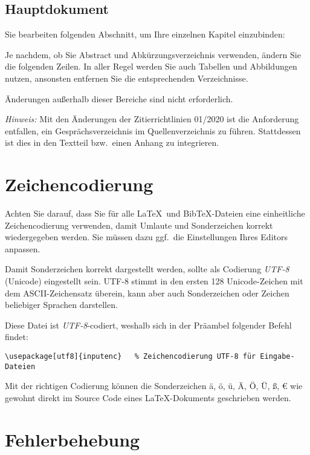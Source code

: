 \subsection{Hauptdokument}

Sie bearbeiten folgenden Abschnitt, um Ihre einzelnen Kapitel einzubinden:
\lstset{language=}


Je nachdem, ob Sie Abstract und Abkürzungsverzeichnis verwenden, ändern Sie die folgenden Zeilen.
In aller Regel werden Sie auch Tabellen und Abbildungen nutzen, ansonsten entfernen Sie die entsprechenden Verzeichnisse. 


Änderungen außerhalb dieser Bereiche sind nicht erforderlich.

\emph{Hinweis:} Mit den Änderungen der Zitierrichtlinien 01/2020 ist die Anforderung entfallen, ein Gesprächsverzeichnis im Quellenverzeichnis zu führen. Stattdessen ist dies in den Textteil bzw.\ einen Anhang zu integrieren.


\section{Zeichencodierung}\label{section:zeichencodierung}

Achten Sie darauf, dass Sie für alle \LaTeX\ und BibTeX-Dateien eine einheitliche Zeichencodierung verwenden, damit Umlaute und Sonderzeichen korrekt wiedergegeben werden. Sie müssen dazu ggf.\ die Einstellungen Ihres Editors anpassen.

Damit Sonderzeichen korrekt dargestellt werden, sollte als Codierung \emph{UTF-8} (Unicode) eingestellt sein. UTF-8 stimmt in den ersten 128 Unicode-Zeichen mit dem ASCII-Zeichensatz überein, kann aber auch Sonderzeichen oder Zeichen beliebiger Sprachen darstellen.

Diese Datei ist \emph{UTF-8}-codiert, weshalb sich in der Präambel folgender Befehl findet:
\lstset{language=TeX} 
\begin{lstlisting}
\usepackage[utf8]{inputenc}   % Zeichencodierung UTF-8 für Eingabe-Dateien
\end{lstlisting}

Mit der richtigen Codierung können die Sonderzeichen ä, ö, ü, Ä, Ö, Ü, ß, € wie gewohnt direkt im Source Code eines \LaTeX-Dokuments geschrieben werden.

\section{Fehlerbehebung}\label{section:fehlerbehebung}

